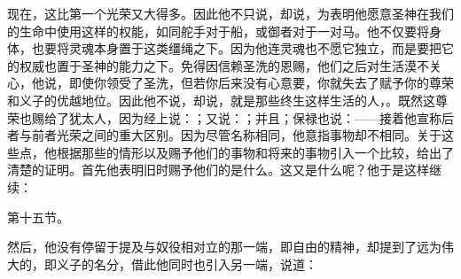 \par

现在，这比第一个光荣又大得多。因此他不只说，却说，为表明他愿意圣神在我们的生命中使用这样的权能，如同舵手对于船，或御者对于一对马。他不仅要将身体，也要将灵魂本身置于这类缰绳之下。因为他连灵魂也不愿它独立，而是要把它的权威也置于圣神的能力之下。免得因信赖圣洗的恩赐，他们之后对生活漠不关心，他说，即使你领受了圣洗，但若你后来没有心意要，你就失去了赋予你的尊荣和义子的优越地位。因此他不说，却说，就是那些终生这样生活的人，。既然这尊荣也赐给了犹太人，因为经上说：；又说：；并且；保禄也说：——接着他宣称后者与前者光荣之间的重大区别。因为尽管名称相同，他意指事物却不相同。关于这些点，他根据那些的情形以及赐予他们的事物和将来的事物引入一个比较，给出了清楚的证明。首先他表明旧时赐予他们的是什么。这又是什么呢？他于是这样继续：\par

第十五节。\par

然后，他没有停留于提及与奴役相对立的那一端，即自由的精神，却提到了远为伟大的，即义子的名分，借此他同时也引入另一端，说道：\par

